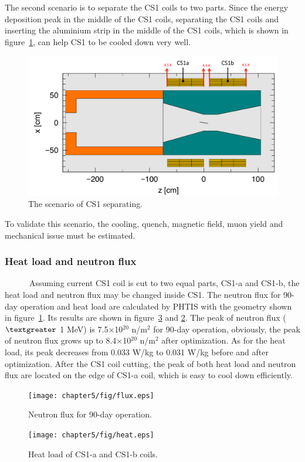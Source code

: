The second scenario is to separate the CS1 coils to two parts.
Since the energy deposition peak in the middle of the CS1 coils, separating the CS1 coils and inserting the aluminium strip in the middle of the CS1 coils, which is shown in figure~\ref{5new}, can help CS1 to be cooled down very well.
\begin{figure}[H]
 \centering
 \includegraphics[scale=0.4]{chapter6/fig/CS1new.pdf}
 \caption{ The scenario of CS1 separating.}
 \label{5new}
\end{figure}
To validate this scenario, the cooling, quench, magnetic field, muon yield and mechanical issue must be estimated.

\subsubsection{Heat load and neutron flux}
~~~~~~Assuming current CS1 coil is cut to two equal parts, CS1-a and CS1-b, the heat load and neutron flux may be changed inside CS1.
The neutron flux for 90-day operation and heat load are calculated by PHTIS with the geometry shown in figure~\ref{5new}.
Its results are shown in figure~\ref{heatload} and \ref{neutr}.
The peak of neutron flux ($\textgreater$ 1 MeV) is 7.5$\times$10$^{20}$ n/m$^2$ for 90-day operation, obviously, the peak of neutron flux grows up to 8.4$\times$10$^{20}$ n/m$^2$ after optimization.
As for the heat load, its peak decreases from 0.033 W/kg to 0.031 W/kg before and after optimization.
After the CS1 coil cutting, the peak of both heat load and neutron flux are located on the edge of CS1-a coil, which is easy to cool down efficiently.
\begin{figure}[H]
 \centering
 \texttt{[image: chapter5/fig/flux.eps]}
 \caption{Neutron flux for 90-day operation.}
 \label{neutr}
\end{figure}
\begin{figure}[H]
 \centering
 \texttt{[image: chapter5/fig/heat.eps]}
 \caption{Heat load of CS1-a and CS1-b coils.}
 \label{heatload}
\end{figure}

